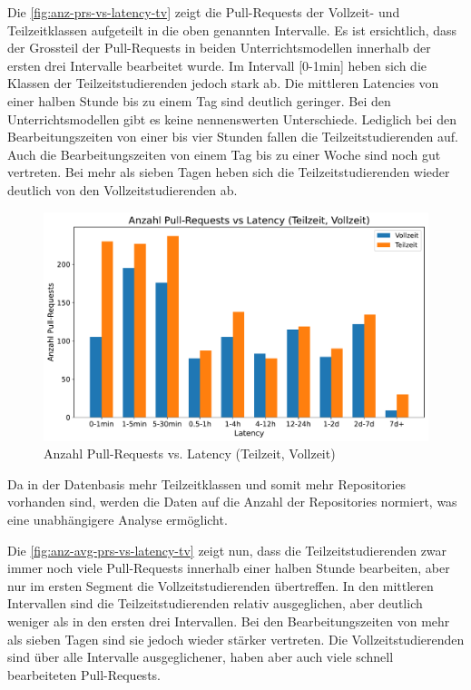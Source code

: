 Die \autoref{fig:anz-prs-vs-latency-tv} zeigt die Pull-Requests der Vollzeit- und Teilzeitklassen aufgeteilt in die oben genannten Intervalle. Es ist ersichtlich, dass der Grossteil der Pull-Requests in beiden Unterrichtsmodellen innerhalb der ersten drei Intervalle bearbeitet wurde. Im Intervall [0-1min] heben sich die Klassen der Teilzeitstudierenden jedoch stark ab. 
Die mittleren Latencies von einer halben Stunde bis zu einem Tag sind deutlich geringer. Bei den Unterrichtsmodellen gibt es keine nennenswerten Unterschiede. Lediglich bei den Bearbeitungszeiten von einer bis vier Stunden fallen die Teilzeitstudierenden auf. Auch die Bearbeitungszeiten von einem Tag bis zu einer Woche sind noch gut vertreten. Bei mehr als sieben Tagen heben sich die Teilzeitstudierenden wieder deutlich von den Vollzeitstudierenden ab.

\begin{figure}[htbp]
    \includegraphics[width=\textwidth]{Figures/anz-prs-vs-latency-tv.pdf}
    \caption{Anzahl Pull-Requests vs. Latency (Teilzeit, Vollzeit)}
    \label{fig:anz-prs-vs-latency-tv}
\end{figure}


Da in der Datenbasis mehr Teilzeitklassen und somit mehr Repositories vorhanden sind, werden die Daten auf die Anzahl der Repositories normiert, was eine unabhängigere Analyse ermöglicht.

\newpage
Die \autoref{fig:anz-avg-prs-vs-latency-tv} zeigt nun, dass die Teilzeitstudierenden zwar immer noch viele Pull-Requests innerhalb einer halben Stunde bearbeiten, aber nur im ersten Segment die Vollzeitstudierenden übertreffen. In den mittleren Intervallen sind die Teilzeitstudierenden relativ ausgeglichen, aber deutlich weniger als in den ersten drei Intervallen. Bei den Bearbeitungszeiten von mehr als sieben Tagen sind sie jedoch wieder stärker vertreten. Die Vollzeitstudierenden sind über alle Intervalle ausgeglichener, haben aber auch viele schnell bearbeiteten Pull-Requests.


